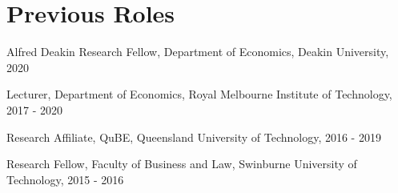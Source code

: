 \documentclass[letterpaper]{article}
\renewenvironment{itemize}{
  \begin{list}{}{
    \setlength{\leftmargin}{1.5em}
  }
}{
  \end{list}
}
\begin{document}
\section*{ Previous Roles}

\begin{itemize}
	
	\item Alfred Deakin Research Fellow, Department of Economics, Deakin University, 2020
	
	\item Lecturer, Department of Economics, Royal Melbourne Institute of Technology, 2017 - 2020
	
	\item Research Affiliate, QuBE, Queensland University of Technology, 2016 - 2019
	
	\item Research Fellow, Faculty of Business and Law, Swinburne University of Technology, 2015 - 2016
	
\end{itemize}
\end{document}

